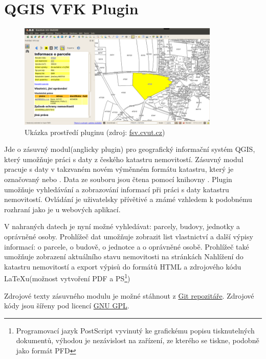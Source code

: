 \section{QGIS VFK Plugin}

\begin{figure}[H]
	 \centering
      \includegraphics[height=5cm]{./pictures/Qgisvfkplugin.png}
      \caption{Ukázka prostředí pluginu (zdroj:
\href{http://freegis.fsv.cvut.cz/wiki/images/4/4b/Qgisvfkplugin-screenshot-05.png}{fsv.cvut.cz})}
      \label{fig:qgis}
  \end{figure}

Jde o zásuvný modul(anglicky plugin) pro geografický informační systém QGIS, který umožňuje práci s daty z českého katastru nemovitostí. Zásuvný modul pracuje s daty v takzvaném novém výměnném formátu katastru, který je označovaný  nebo . Data ze souboru jsou čtena pomocí knihovny . Plugin umožňuje vyhledávání a zobrazování informací při práci s daty katastru nemovitostí. Ovládání je uživatelsky přívětivé a známé vzhledem k podobnému rozhraní jako je u webových aplikací.

V nahraných datech je nyní možné vyhledávat: parcely, budovy, jednotky a oprávněné osoby. Prohlížeč dat umožňuje zobrazit list vlastnictví a další výpisy informací: o parcele, o budově, o jednotce a o oprávněné osobě. Prohlížeč také umožňuje zobrazení aktuálního stavu nemovitosti na stránkách Nahlížení do katastru nemovitostí a export výpisů do formátů HTML a zdrojového kódu LaTeXu(možnost vytvoření PDF a PS\footnote{Programovací jazyk PostScript vyvinutý ke grafickému popisu tisknutelných dokumentů, výhodou je nezávislost na zařízení, ze kterého se tiskne, podobně jako formát PFD\cite{PostScript}})

Zdrojové texty zásuvného modulu je možné stáhnout z \href{https://github.com/ctu-geoforall-lab/qgis-vfk-plugin}{Git repozitáře}. Zdrojové kódy jsou šířeny pod licencí \href{https://raw.githubusercontent.com/ctu-osgeorel/qgis-vfk-plugin/master/LICENSE}{GNU GPL}.

